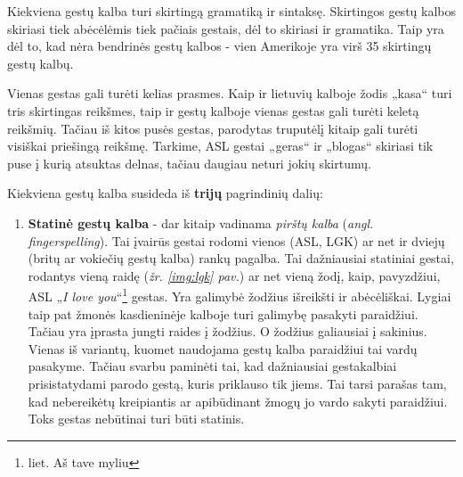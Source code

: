 \documentclass{VUMIFPSbakalaurinis}
\begin{document}
Kiekviena gestų kalba turi skirtingą gramatiką ir sintaksę. Skirtingos gestų kalbos skiriasi tiek abėcėlėmis tiek pačiais gestais, dėl to skiriasi ir gramatika. Taip yra dėl to, kad nėra bendrinės gestų kalbos - vien Amerikoje yra virš 35 skirtingų gestų kalbų.

Vienas gestas gali turėti kelias prasmes. Kaip ir lietuvių kalboje žodis „kasa“ turi tris skirtingas reikšmes, taip ir gestų kalboje vienas gestas gali turėti keletą reikšmių. Tačiau iš kitos pusės gestas, parodytas truputėlį kitaip gali turėti visiškai priešingą reikšmę. Tarkime, ASL gestai „geras“ ir „blogas“ skiriasi tik puse į kurią atsuktas delnas, tačiau daugiau neturi jokių skirtumų.

Kiekviena gestų kalba susideda iš \textbf{trijų} pagrindinių dalių:
\begin{enumerate}
	\item\textbf{Statinė gestų kalba} - dar kitaip vadinama \textit{pirštų kalba} (\textit{angl. fingerspelling}). Tai įvairūs gestai rodomi vienos (ASL, LGK) ar net ir dviejų (britų ar vokiečių gestų kalba) rankų pagalba. Tai dažniausiai statiniai gestai, rodantys vieną raidę (\textit{žr. \ref{img:lgk} pav.}) ar net vieną žodį, kaip, pavyzdžiui, ASL „\textit{I love you}“\footnote{liet. Aš tave myliu} gestas. Yra galimybė žodžius išreikšti ir abėcėliškai. Lygiai taip pat žmonės kasdieninėje kalboje turi galimybę pasakyti paraidžiui. Tačiau yra įprasta jungti raides į žodžius. O žodžius galiausiai į sakinius. Vienas iš variantų, kuomet naudojama gestų kalba paraidžiui tai vardų pasakyme. Tačiau svarbu paminėti tai, kad dažniausiai gestakalbiai prisistatydami parodo gestą, kuris priklauso tik jiems. Tai tarsi parašas tam, kad nebereikėtų kreipiantis ar apibūdinant žmogų jo vardo sakyti paraidžiui. Toks gestas nebūtinai turi būti statinis.
	

\end{enumerate}
\end{document}
